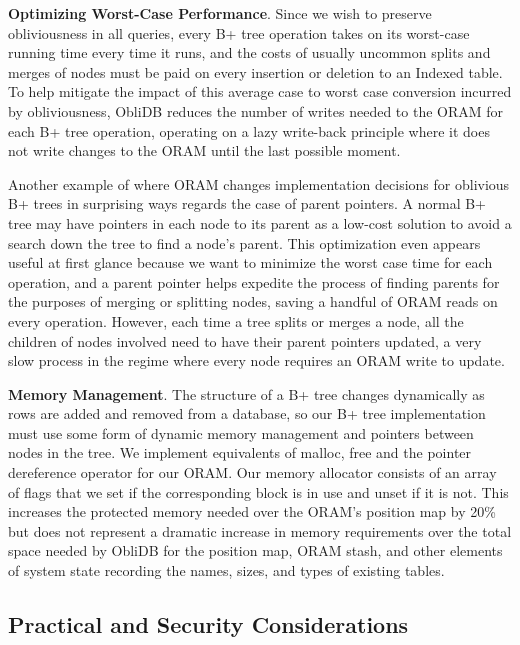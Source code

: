 \documentclass[letterpaper,twocolumn,10pt]{article}
\def\name/{ObliDB}
\begin{document}
\noindent \textbf{Optimizing Worst-Case Performance}. Since we wish to preserve obliviousness in all queries, every B+ tree operation takes on its worst-case running time every time it runs, and the costs of usually uncommon splits and merges of nodes must be paid on every insertion or deletion to an Indexed table. To help mitigate the impact of this average case to worst case conversion incurred by obliviousness, \name/ reduces the number of writes needed to the ORAM for each B+ tree operation, operating on a lazy write-back principle where it does not write changes to the ORAM until the last possible moment.

Another example of where ORAM changes implementation decisions for oblivious B+ trees in surprising ways regards the case of parent pointers. A normal B+ tree may have pointers in each node to its parent as a low-cost solution to avoid a search down the tree to find a node's parent. This optimization even appears useful at first glance because we want to minimize the worst case time for each operation, and a parent pointer helps expedite the process of finding parents for the purposes of merging or splitting nodes, saving a handful of ORAM reads on every operation. However, each time a tree splits or merges a node, all the children of nodes involved need to have their parent pointers updated, a very slow process in the regime where every node requires an ORAM write to update.

\noindent \textbf{Memory Management}. The structure of a B+ tree changes dynamically as rows are added and removed from a database, so our B+ tree implementation must use some form of dynamic memory management and pointers between nodes in the tree. We implement equivalents of malloc, free and the pointer dereference operator for our ORAM. Our memory allocator consists of an array of flags that we set if the corresponding block is in use and unset if it is not. This increases the protected memory needed over the ORAM's position map by 20\% but does not represent a dramatic increase in memory requirements over the total space needed by \name/ for the position map, ORAM stash, and other elements of system state recording the names, sizes, and types of existing tables.

\subsection{Practical and Security Considerations}
\end{document}
